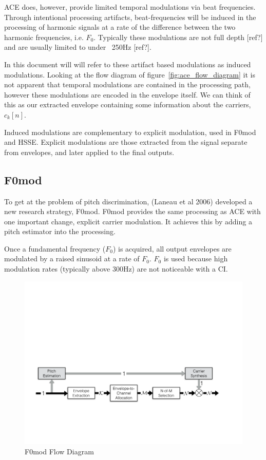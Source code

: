 \documentclass [11pt, proquest] {uwthesis}[2015/03/03]
\begin{document}
ACE does, however, provide limited temporal modulations via beat frequencies.  Through intentional processing artifacts, beat-frequencies will be induced in the processing of harmonic signals at a rate of the difference between the two harmonic frequencies, i.e. $F_0$.  Typically these modulations are not full depth [ref?] and are usually limited to under ~250Hz [ref?].

In this document will will refer to these artifact based modulations as induced modulations.  Looking at the flow diagram of figure~\ref{fig:ace_flow_diagram} it is not apparent that temporal modulations are contained in the processing path, however these modulations are encoded in the envelope itself.  We can think of this as our extracted envelope containing some information about the carriers, $c_k[n]$.

Induced modulations are complementary to explicit modulation, used in F0mod and HSSE.  Explicit modulations are those extracted from the signal separate from envelopes, and later applied to the final outputs.

\subsection{F0mod}

To get at the problem of pitch discrimination, (Laneau et al 2006) developed a new research strategy, F0mod.  F0mod provides the same processing as ACE with one important change, explicit carrier modulation.  It achieves this by adding a pitch estimator into the processing.

Once a fundamental frequency ($F_0$) is acquired, all output envelopes are modulated by a raised sinusoid at a rate of $F_0$.  $F_0$ is used because high modulation rates (typically above 300Hz) are not noticeable with a CI.

\begin{figure}[!ht]
  \centering
    \includegraphics[width=1\textwidth]{F0mod_flow_diagram}   
    \caption{F0mod Flow Diagram}
\end{figure}
\end{document}
